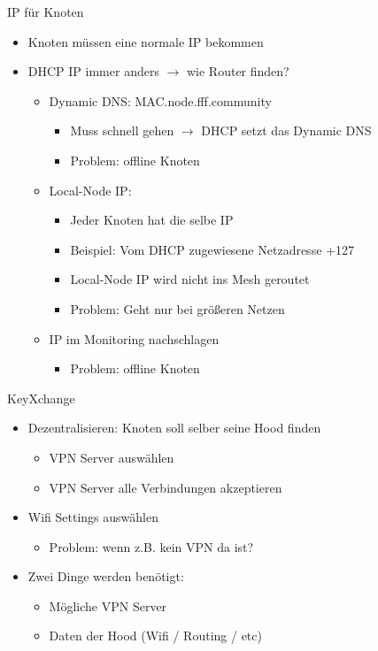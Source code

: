 \begin{frame}{IP für Knoten}
    \begin{itemize}
        \item Knoten müssen eine normale IP bekommen
        \item DHCP IP immer anders $\rightarrow$ wie Router finden?
        \begin{itemize}
            \item Dynamic DNS: MAC.node.fff.community
            \begin{itemize}
                \item Muss schnell gehen $\rightarrow$ DHCP setzt das Dynamic DNS
                \item Problem: offline Knoten
            \end{itemize}
            \item Local-Node IP:
            \begin{itemize}
                \item Jeder Knoten hat die selbe IP
                \item Beispiel: Vom DHCP zugewiesene Netzadresse +127
                \item Local-Node IP wird nicht ins Mesh geroutet
                \item Problem: Geht nur bei größeren Netzen
            \end{itemize}
            \item IP im Monitoring nachschlagen
            \begin{itemize}
                \item Problem: offline Knoten
            \end{itemize}
        \end{itemize}
    \end{itemize}
\end{frame}

\begin{frame}{KeyXchange}
    \begin{itemize}
        \item Dezentralisieren: Knoten soll selber seine Hood finden
        \begin{itemize}
            \item VPN Server auswählen
            \item VPN Server alle Verbindungen akzeptieren
        \end{itemize}
        \item Wifi Settings auswählen
        \begin{itemize}
            \item Problem: wenn z.B. kein VPN da ist?
        \end{itemize}
        \item Zwei Dinge werden benötigt: 
        \begin{itemize}
            \item Mögliche VPN Server
            \item Daten der Hood (Wifi / Routing / etc)
        \end{itemize}
    \end{itemize}
\end{frame}


